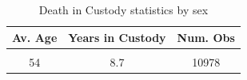 \begin{table}
\centering
\caption{Death in Custody statistics by sex}
\centering
\begin{tabular}[t]{ccc}
\toprule
Av. Age & Years in Custody & Num. Obs\\
\midrule
\cellcolor{gray!10}{47} & \cellcolor{gray!10}{3.6} & \cellcolor{gray!10}{684}\\
54 & 8.7 & 10978\\
\bottomrule
\end{tabular}
\end{table}
